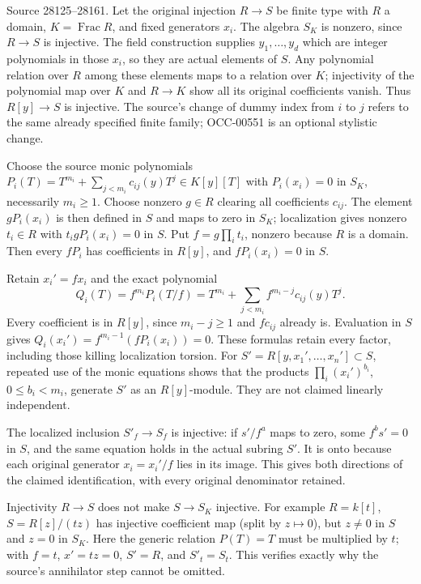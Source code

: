 Source 28125--28161. Let the original injection \(R\to S\) be finite type with \(R\) a domain, \(K=\operatorname{Frac}R\), and fixed generators \(x_i\). The algebra \(S_K\) is nonzero, since \(R\to S\) is injective. The field construction supplies \(y_1,\ldots,y_d\) which are integer polynomials in those \(x_i\), so they are actual elements of \(S\). Any polynomial relation over \(R\) among these elements maps to a relation over \(K\); injectivity of the polynomial map over \(K\) and \(R\to K\) show all its original coefficients vanish. Thus \(R[y]\to S\) is injective. The source's change of dummy index from \(i\) to \(j\) refers to the same already specified finite family; OCC-00551 is an optional stylistic change.

Choose the source monic polynomials \(P_i(T)=T^{m_i}+\sum_{j<m_i}c_{ij}(y)T^j\in K[y][T]\) with \(P_i(x_i)=0\) in \(S_K\), necessarily \(m_i\geq1\). Choose nonzero \(g\in R\) clearing all coefficients \(c_{ij}\). The element \(gP_i(x_i)\) is then defined in \(S\) and maps to zero in \(S_K\); localization gives nonzero \(t_i\in R\) with \(t_i gP_i(x_i)=0\) in \(S\). Put \(f=g\prod_i t_i\), nonzero because \(R\) is a domain. Then every \(fP_i\) has coefficients in \(R[y]\), and \(fP_i(x_i)=0\) in \(S\).

Retain \(x_i'=fx_i\) and the exact polynomial \[
 Q_i(T)=f^{m_i}P_i(T/f)
       =T^{m_i}+\sum_{j<m_i} f^{m_i-j}c_{ij}(y)T^j .
\] Every coefficient is in \(R[y]\), since \(m_i-j\geq1\) and \(fc_{ij}\) already is. Evaluation in \(S\) gives \(Q_i(x_i')=f^{m_i-1}(fP_i(x_i))=0\). These formulas retain every factor, including those killing localization torsion. For \(S'=R[y,x_1',\ldots,x_n']\subset S\), repeated use of the monic equations shows that the products \(\prod_i(x_i')^{b_i}\), \(0\leq b_i<m_i\), generate \(S'\) as an \(R[y]\)-module. They are not claimed linearly independent.

The localized inclusion \(S'_f\to S_f\) is injective: if \(s'/f^a\) maps to zero, some \(f^b s'=0\) in \(S\), and the same equation holds in the actual subring \(S'\). It is onto because each original generator \(x_i=x_i'/f\) lies in its image. This gives both directions of the claimed identification, with every original denominator retained.

Injectivity \(R\to S\) does not make \(S\to S_K\) injective. For example \(R=k[t]\), \(S=R[z]/(tz)\) has injective coefficient map (split by \(z\mapsto0\)), but \(z\ne0\) in \(S\) and \(z=0\) in \(S_K\). Here the generic relation \(P(T)=T\) must be multiplied by \(t\); with \(f=t\), \(x'=tz=0\), \(S'=R\), and \(S'_t=S_t\). This verifies exactly why the source's annihilator step cannot be omitted.

